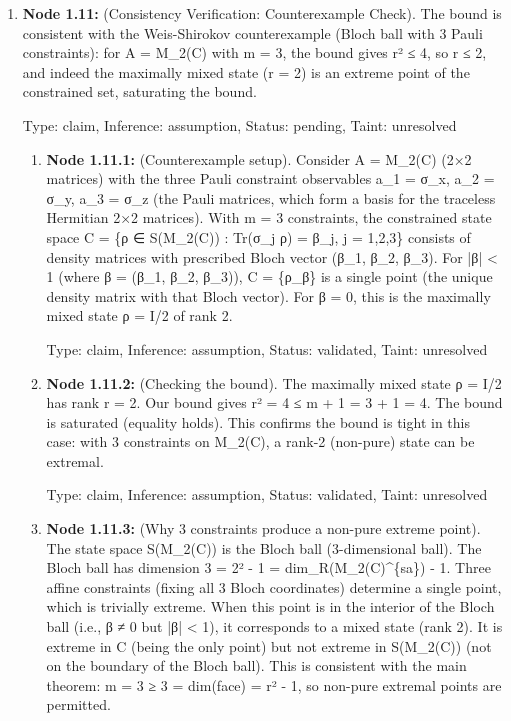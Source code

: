 \documentclass{article}
\begin{document}
\begin{enumerate}
\begin{enumerate}
  Type: claim, Inference: assumption, Status: pending, Taint: unresolved

\end{enumerate}
\item \textbf{Node 1.11:} (Consistency Verification: Counterexample Check). The bound is consistent with the Weis-Shirokov counterexample (Bloch ball with 3 Pauli constraints): for A = M\_2(C) with m = 3, the bound gives r² ≤ 4, so r ≤ 2, and indeed the maximally mixed state (r = 2) is an extreme point of the constrained set, saturating the bound.

  Type: claim, Inference: assumption, Status: pending, Taint: unresolved

\begin{enumerate}
\item \textbf{Node 1.11.1:} (Counterexample setup). Consider A = M\_2(C) (2×2 matrices) with the three Pauli constraint observables a\_1 = σ\_x, a\_2 = σ\_y, a\_3 = σ\_z (the Pauli matrices, which form a basis for the traceless Hermitian 2×2 matrices). With m = 3 constraints, the constrained state space C = \{ρ ∈ S(M\_2(C)) : Tr(σ\_j ρ) = β\_j, j = 1,2,3\} consists of density matrices with prescribed Bloch vector (β\_1, β\_2, β\_3). For |β| < 1 (where β = (β\_1, β\_2, β\_3)), C = \{ρ\_β\} is a single point (the unique density matrix with that Bloch vector). For β = 0, this is the maximally mixed state ρ = I/2 of rank 2.

  Type: claim, Inference: assumption, Status: validated, Taint: unresolved

\item \textbf{Node 1.11.2:} (Checking the bound). The maximally mixed state ρ = I/2 has rank r = 2. Our bound gives r² = 4 ≤ m + 1 = 3 + 1 = 4. The bound is saturated (equality holds). This confirms the bound is tight in this case: with 3 constraints on M\_2(C), a rank-2 (non-pure) state can be extremal.

  Type: claim, Inference: assumption, Status: validated, Taint: unresolved

\item \textbf{Node 1.11.3:} (Why 3 constraints produce a non-pure extreme point). The state space S(M\_2(C)) is the Bloch ball (3-dimensional ball). The Bloch ball has dimension 3 = 2² - 1 = dim\_R(M\_2(C)\textasciicircum{}\{sa\}) - 1. Three affine constraints (fixing all 3 Bloch coordinates) determine a single point, which is trivially extreme. When this point is in the interior of the Bloch ball (i.e., β ≠ 0 but |β| < 1), it corresponds to a mixed state (rank 2). It is extreme in C (being the only point) but not extreme in S(M\_2(C)) (not on the boundary of the Bloch ball). This is consistent with the main theorem: m = 3 ≥ 3 = dim(face) = r² - 1, so non-pure extremal points are permitted.


\end{enumerate}
\end{enumerate}
\end{document}
